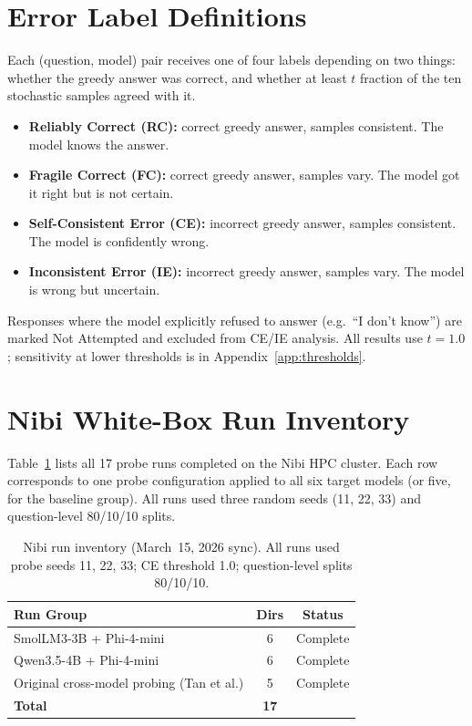 \documentclass[12pt,twocolumn]{article}
\begin{document}
\section{Error Label Definitions}
\label{app:labels}

Each (question, model) pair receives one of four labels depending on
two things: whether the greedy answer was correct, and whether at
least $t$ fraction of the ten stochastic samples agreed with it.

\begin{itemize}[nosep]
\item \textbf{Reliably Correct (RC):} correct greedy answer, samples
      consistent. The model knows the answer.
\item \textbf{Fragile Correct (FC):} correct greedy answer, samples
      vary. The model got it right but is not certain.
\item \textbf{Self-Consistent Error (CE):} incorrect greedy answer,
      samples consistent. The model is confidently wrong.
\item \textbf{Inconsistent Error (IE):} incorrect greedy answer,
      samples vary. The model is wrong but uncertain.
\end{itemize}

Responses where the model explicitly refused to answer (e.g.\
``I don't know'') are marked Not Attempted and excluded from CE/IE
analysis. All results use $t{=}1.0$; sensitivity at lower thresholds
is in Appendix~\ref{app:thresholds}.

\section{Nibi White-Box Run Inventory}
\label{app:nibi}

Table~\ref{tab:nibi_inventory} lists all 17 probe runs completed on
the Nibi HPC cluster. Each row corresponds to one probe configuration
applied to all six target models (or five, for the baseline group).
All runs used three random seeds (11, 22, 33) and question-level
80/10/10 splits.

\begin{table}[H]
\centering
\footnotesize
\begin{tabularx}{0.92\linewidth}{>{\raggedright\arraybackslash}Xcc}
\toprule
Run Group & Dirs & Status \\
\midrule
SmolLM3-3B + Phi-4-mini & 6 & Complete \\
Qwen3.5-4B + Phi-4-mini & 6 & Complete \\
Original cross-model probing (Tan et al.) & 5 & Complete \\
\midrule
\textbf{Total}           & \textbf{17} & \\
\bottomrule
\end{tabularx}
\caption{Nibi run inventory (March~15, 2026 sync). All runs used
probe seeds 11, 22, 33; CE threshold 1.0; question-level splits
80/10/10.}
\label{tab:nibi_inventory}
\end{table}
\end{document}
